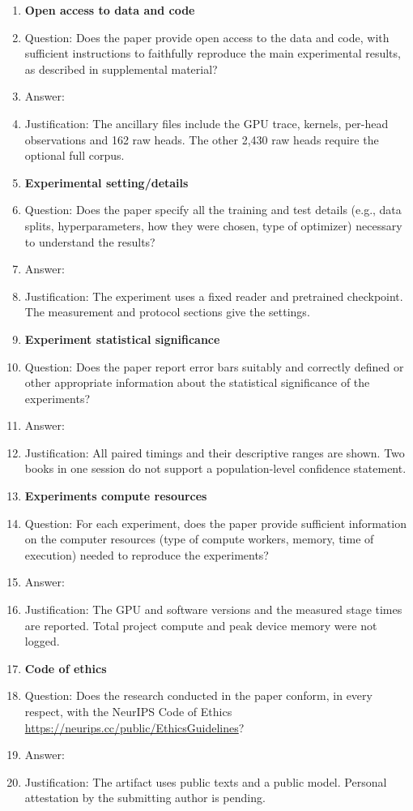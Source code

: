 \begin{enumerate}
\item {\bf Open access to data and code}
    \item[] Question: Does the paper provide open access to the data and code, with sufficient instructions to faithfully reproduce the main experimental results, as described in supplemental material?
    \item[] Answer: \answerNo{}
    \item[] Justification: The ancillary files include the GPU trace, kernels, per-head observations and 162 raw heads. The other 2,430 raw heads require the optional full corpus.



\item {\bf Experimental setting/details}
    \item[] Question: Does the paper specify all the training and test details (e.g., data splits, hyperparameters, how they were chosen, type of optimizer) necessary to understand the results?
    \item[] Answer: \answerYes{}
    \item[] Justification: The experiment uses a fixed reader and pretrained checkpoint. The measurement and protocol sections give the settings.


\item {\bf Experiment statistical significance}
    \item[] Question: Does the paper report error bars suitably and correctly defined or other appropriate information about the statistical significance of the experiments?
    \item[] Answer: \answerNo{}
    \item[] Justification: All paired timings and their descriptive ranges are shown. Two books in one session do not support a population-level confidence statement.


\item {\bf Experiments compute resources}
    \item[] Question: For each experiment, does the paper provide sufficient information on the computer resources (type of compute workers, memory, time of execution) needed to reproduce the experiments?
    \item[] Answer: \answerNo{}
    \item[] Justification: The GPU and software versions and the measured stage times are reported. Total project compute and peak device memory were not logged.

    
\item {\bf Code of ethics}
    \item[] Question: Does the research conducted in the paper conform, in every respect, with the NeurIPS Code of Ethics \url{https://neurips.cc/public/EthicsGuidelines}?
    \item[] Answer: \answerNA{}
    \item[] Justification: The artifact uses public texts and a public model. Personal attestation by the submitting author is pending.




\end{enumerate}
